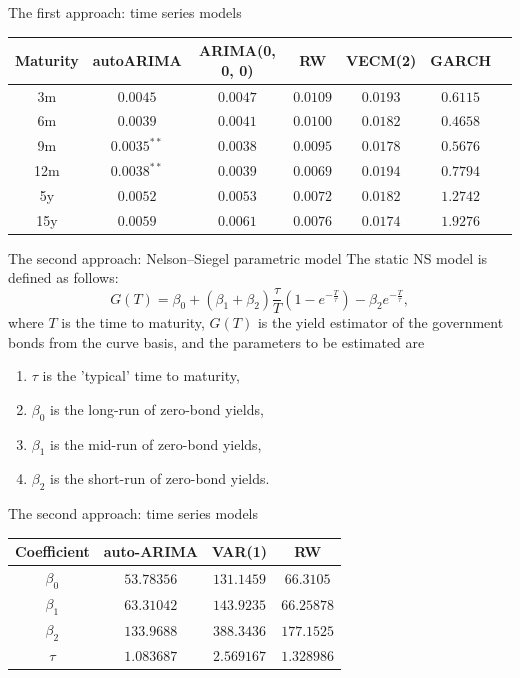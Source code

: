 \documentclass[aspectratio=169]{beamer}
\begin{document}
    \begin{frame}{The first approach: time series models}
\begin{tabular}{|c c c c c c c|} 
    \hline
    Maturity & autoARIMA & ARIMA(0, 0, 0) & RW & VECM(2) & GARCH \\
    \hline
    3m & $0.0045$ & $0.0047$ & $0.0109$ & $0.0193$ & $0.6115$ \\ 
    \hline
    6m & $0.0039$  & 0.$0041$ & $0.0100$ & $0.0182$ & $0.4658$ \\
    \hline
    9m & $0.0035^{**}$ & $0.0038$ & $0.0095$ & $0.0178$ & $0.5676$ \\
    \hline
    12m & $0.0038^{**}$ & $0.0039$ & $0.0069$ & $0.0194$ & $0.7794$ \\
    \hline
    5y & $0.0052$ & $0.0053$ & $0.0072$ & $0.0182$ & $1.2742$\\
    \hline
    15y & $0.0059$ & $0.0061$ & $0.0076$ & $0.0174$ & $1.9276$ \\ 
    \hline
\end{tabular}
    \end{frame}

    \begin{frame}{The second approach: Nelson--Siegel parametric model}
        The static NS model is defined as follows:
            \begin{equation}\label{eq:NS}
                G(T) = \beta_0 + (\beta_1+\beta_2)\frac{\tau}{T}\left(1-e^{-\frac{T}{\tau}}\right)-\beta_2  e^{-\frac{T}{\tau}},
            \end{equation}
            where $T$ is the time to maturity, $G(T)$ is the yield estimator of the government bonds from the curve basis, 
            and the parameters to be estimated are
            \begin{enumerate}
                \item $\tau$ is the 'typical' time to maturity, 
                \item $\beta_0$ is the long-run of zero-bond yields, 
                \item $\beta_1$ is the mid-run of zero-bond yields, 
                \item $\beta_2$ is the short-run of zero-bond yields.
            \end{enumerate}
    \end{frame}

    \begin{frame}{The second approach: time series models}
    \begin{tabular}{|c | c c c|} 
        \hline
        Coefficient & auto-ARIMA & VAR(1) & RW \\
        \hline
        $\beta_0$ & $53.78356$ & $131.1459$ & $66.3105$ \\ 
        \hline
        $\beta_1$ & $63.31042$ & $143.9235$ & $66.25878$ \\
        \hline
        $\beta_2$ & $133.9688$ & $388.3436$ & $177.1525$ \\
        \hline
        $\tau$ & $1.083687$ & $2.569167$ & $1.328986$ \\
        \hline
    \end{tabular}
\end{frame}
\end{document}
